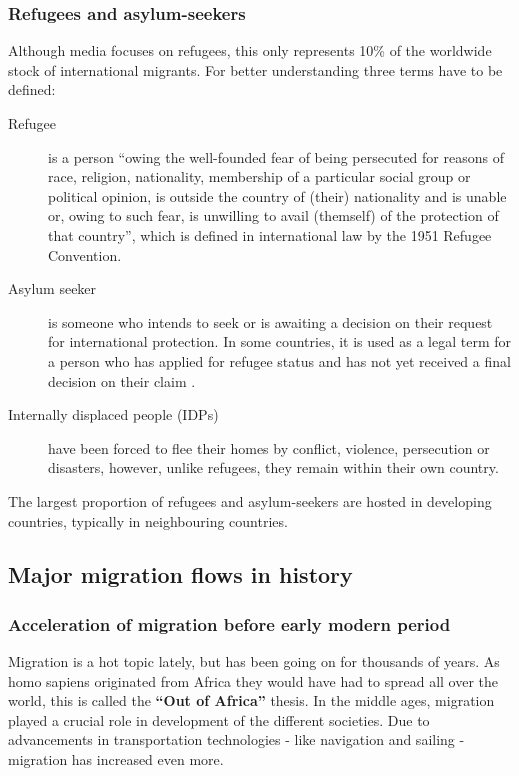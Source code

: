 \documentclass[../summary.tex]{subfiles}
\begin{document}
	\subsubsection{Refugees and asylum-seekers}
	Although media focuses on refugees, this only represents 10\% of the worldwide stock of international migrants. For better understanding three terms have to be defined:
	\begin{description}
		\item[Refugee] is a person ``owing the well-founded fear of being persecuted for reasons of race, religion, nationality, membership of a particular social group or political opinion, is outside the country of (their) nationality and is unable or, owing to such fear, is unwilling to avail (themself) of the protection of that country'', which is defined in international law by the 1951 Refugee Convention.
		\item[Asylum seeker] is someone who intends to seek or is awaiting a decision on their request for international protection. In some countries, it is used as a legal term for a person who has applied for refugee status and has not yet received a final decision on their claim .
		\item[Internally displaced people (IDPs)] have been forced to flee their homes by conflict, violence, persecution or disasters, however, unlike refugees, they remain within their own country.
	\end{description}
	The largest proportion of refugees and asylum-seekers are hosted in developing countries, typically in neighbouring countries.
	
	
	\subsection{Major migration flows in history}
	\subsubsection{Acceleration of migration before early modern period}
	Migration is a hot topic lately, but has been going on for thousands of years. As homo sapiens originated from Africa they would have had to spread all over the world, this is called the \textbf{``Out of Africa''} thesis. In the middle ages, migration played a crucial role in development of the different societies. Due to advancements in transportation technologies - like navigation and sailing - migration has increased even more. 
	
\end{document}
